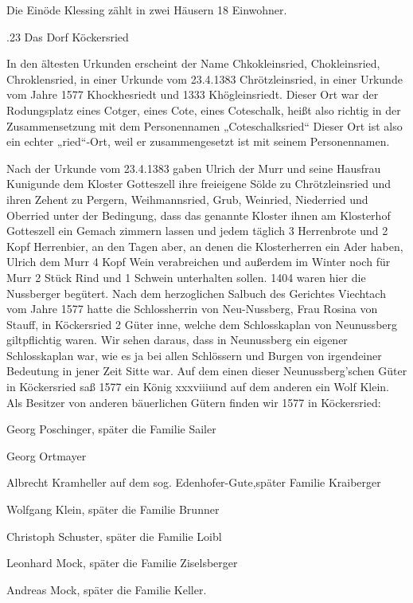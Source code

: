 \documentclass{book}
\begin{document}
Die Einöde Klessing zählt in zwei Häusern 18 Einwohner.

.23 Das Dorf Köckersried

In den ältesten Urkunden erscheint der Name Chkokleinsried, Chokleinsried,
Chroklensried, in einer Urkunde vom 23.4.1383 Chrötzleinsried, in einer Urkunde
vom Jahre 1577 Khockhesriedt und 1333 Khögleinsriedt. Dieser Ort war der
Rodungsplatz eines Cotger, eines Cote, eines Coteschalk, heißt also richtig in
der Zusammensetzung mit dem Personennamen „Coteschalksried“ Dieser Ort ist also
ein echter „ried“-Ort, weil er zusammengesetzt ist mit seinem Personennamen.

Nach der Urkunde vom 23.4.1383 gaben Ulrich der Murr und seine Hausfrau
Kunigunde dem Kloster Gotteszell ihre freieigene Sölde zu Chrötzleinsried und
ihren Zehent zu Pergern, Weihmannsried, Grub, Weinried, Niederried und Oberried
unter der Bedingung, dass das genannte Kloster ihnen am Klosterhof Gotteszell
ein Gemach zimmern lassen und jedem täglich 3 Herrenbrote und 2 Kopf Herrenbier,
an den Tagen aber, an denen die Klosterherren ein Ader haben, Ulrich dem Murr 4
Kopf Wein verabreichen und außerdem im Winter noch für Murr 2 Stück Rind und 1
Schwein unterhalten sollen. 1404 waren hier die Nussberger begütert. Nach dem
herzoglichen Salbuch des Gerichtes Viechtach vom Jahre 1577 hatte die
Schlossherrin von Neu-Nussberg, Frau Rosina von Stauff, in Köckersried 2 Güter
inne, welche dem Schlosskaplan von Neunussberg giltpflichtig waren. Wir sehen
daraus, dass in Neunussberg ein eigener Schlosskaplan war, wie es ja bei allen
Schlössern und Burgen von irgendeiner Bedeutung in jener Zeit Sitte war. Auf dem
einen dieser Neunussberg'schen Güter in Köckersried saß 1577 ein König
xxxviiiund auf dem anderen ein Wolf Klein. Als Besitzer von anderen bäuerlichen
Gütern finden wir 1577 in Köckersried:



Georg Poschinger, später die Familie Sailer

Georg Ortmayer

Albrecht Kramheller auf dem sog. Edenhofer-Gute,später Familie Kraiberger

Wolfgang Klein, später die Familie Brunner

Christoph Schuster, später die Familie Loibl

Leonhard Mock, später die Familie Ziselsberger

Andreas Mock, später die Familie Keller.
\end{document}
